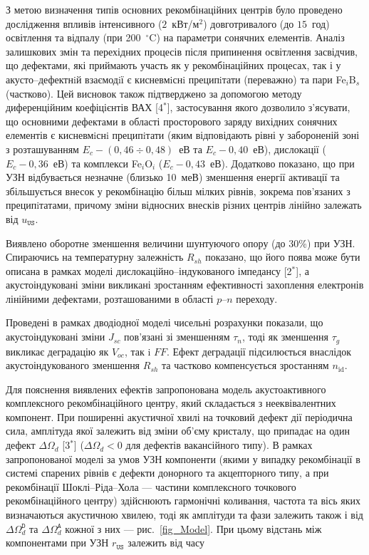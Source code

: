 З метою визначення типів основних рекомбінаційних центрів
було проведено дослідження впливів інтенсивного ($2$~кВт/м$^2$) довготривалого (до  $15$~год) освітлення
та відпалу (при 200~$^\circ$C) на параметри сонячних елементів.
Аналіз залишкових змін та перехідних процесів після припинення освітлення засвідчив, що дефектами, які приймають участь як у рекомбінаційних процесах, так і у акусто--дефектнiй взаємодiї є кисневмiснi преципiтати (переважно) та
пари Fe$_i$B$_s$ (частково).
Цей висновок також підтверджено за допомогою методу диференційним коефіцієнтів ВАХ
[4$^*$],
застосування якого дозволило з'ясувати, що основними дефектами в області просторового заряду вихідних сонячних елементів є кисневмiснi преципiтати  (яким відповідають рівні у забороненій зоні з розташуванням  $E_c-(0,46\div0,48)$~еВ та $E_c-0,40$~еВ), дислокації ($E_c-0,36$~еВ) та комплекси Fe$_i$O$_i$ ($E_c-0,43$~еВ).
Додатково показано, що
при УЗН відбувається незначне (близько 10~меВ) зменшення енергії активації та збільшується внесок
у рекомбінацію більш мілких рівнів, зокрема пов'язаних з преципiтатами, причому зміни відносних внесків різних центрів лінійно залежать від $u_\mathtt{US}$.

Виявлено оборотне зменшення величини шунтуючого опору (до 30\%) при УЗН.
Спираючись на температурну залежність $R_{sh}$ показано, що його поява може бути описана в рамках моделі дислокаційно--індукованого імпедансу
[2$^*$], а акустоіндуковані зміни викликані зростанням ефективності захоплення електронів лінійними дефектами, розташованими в області $p$--$n$ переходу.

Проведені в рамках дводіодної моделі чисельні розрахунки показали, що акустоіндуковані зміни $J_{sc}$ пов'язані зі зменшенням $\tau_{n}$,
тоді як зменшення $\tau_{g}$ викликає деградацію як $V_{oc}$, так i $F\!F$.
Ефект деградації підсилюється внаслідок акустоіндукованого зменшення $R_{sh}$ та частково компенсується зростанням $n_\mathrm{id}$.

Для пояснення виявлених ефектів запропонована модель акустоактивного комплексного рекомбінаційного центру, який складається з нееквівалентних компонент.
При поширенні акустичної хвилі на точковий дефект дії періодична сила, амплітуда якої залежить від зміни об'єму кристалу, що припадає на один дефект $\Delta\Omega_d$
[3$^*$] ($\Delta\Omega_d<0$ для дефектів вакансійного типу).
В рамках запропонованої моделі за умов УЗН компоненти (якими у випадку рекомбінації в системі спарених рівнів є  дефекти донорного та акцепторного типу, а при рекомбінації Шоклі--Ріда--Хола --- частини комплексного точкового рекомбінаційного центру) здійснюють гармонічні коливання, частота та вісь яких
визначаються акустичною хвилею, тоді як амплітуди та фази залежить також і від  $\Delta\Omega_d^\mathtt{D}$ та
$\Delta\Omega_d^\mathtt{A}$ кожної з них --- рис.~\ref{fig_Model}.
При цьому відстань між компонентами при УЗН $r_\mathtt{US}$ залежить від часу

